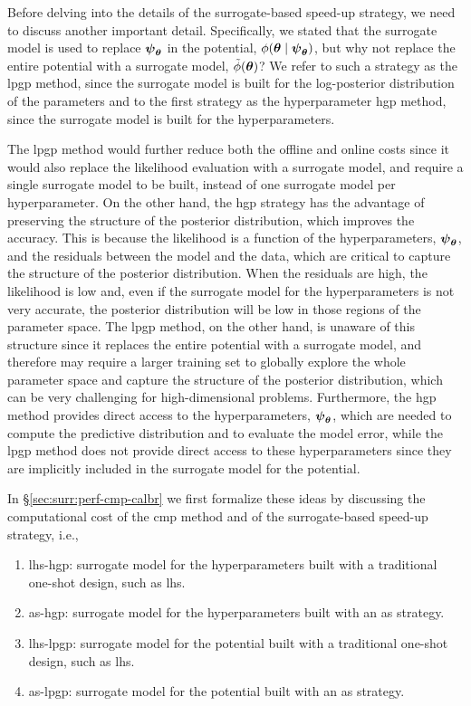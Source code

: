 \smallskip
Before delving into the details of the surrogate-based speed-up strategy, we need to discuss another important detail. Specifically, we stated that the surrogate model is used to replace $\boldsymbol{\psi}_{\boldsymbol{\theta}}$ in the potential, $\phi(\boldsymbol{\theta} \mid \boldsymbol{\psi}_{\boldsymbol{\theta}})$, but why not replace the entire potential with a surrogate model, $\tilde{\phi}(\boldsymbol{\theta})$? We refer to such a strategy as the \gls{lpgp} method, since the surrogate model is built for the log-posterior distribution of the parameters and to the first strategy as the hyperparameter \gls{hgp} method, since the surrogate model is built for the hyperparameters. 

\smallskip
The \gls{lpgp} method would further reduce both the offline and online costs since it would also replace the likelihood evaluation with a surrogate model, and require a single surrogate model to be built, instead of one surrogate model per hyperparameter. On the other hand, the \gls{hgp} strategy has the advantage of preserving the structure of the posterior distribution, which improves the accuracy. This is because the likelihood is a function of the hyperparameters, $\boldsymbol{\psi}_{\boldsymbol{\theta}}$, and the residuals between the model and the data, which are critical to capture the structure of the posterior distribution. When the residuals are high, the likelihood is low and, even if the surrogate model for the hyperparameters is not very accurate, the posterior distribution will be low in those regions of the parameter space. The \gls{lpgp} method, on the other hand, is unaware of this structure since it replaces the entire potential with a surrogate model, and therefore may require a larger training set to globally explore the whole parameter space and capture the structure of the posterior distribution, which can be very challenging for high-dimensional problems. Furthermore, the \gls{hgp} method provides direct access to the hyperparameters, $\boldsymbol{\psi}_{\boldsymbol{\theta}}$, which are needed to compute the predictive distribution and to evaluate the model error, while the \gls{lpgp} method does not provide direct access to these hyperparameters since they are implicitly included in the surrogate model for the potential.

\smallskip
In \S\ref{sec:surr:perf-cmp-calbr} we first formalize these ideas by discussing the computational cost of the \gls{cmp} method and of the surrogate-based speed-up strategy, i.e.,

\begin{enumerate}
  \item \gls{lhs}-\gls{hgp}: surrogate model for the hyperparameters built with a traditional one-shot design, such as \gls{lhs}.
  \item \gls{as}-\gls{hgp}: surrogate model for the hyperparameters built with an \gls{as} strategy.
  \item \gls{lhs}-\gls{lpgp}: surrogate model for the potential built with a traditional one-shot design, such as \gls{lhs}.
  \item \gls{as}-\gls{lpgp}: surrogate model for the potential built with an \gls{as} strategy.
\end{enumerate}

